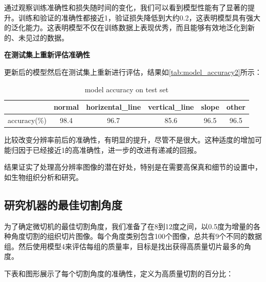 通过观察训练准确性和损失随时间的变化，我们可以看到模型性能有了显著的提升。训练和验证的准确性都接近1，验证损失降低到大约0.2，这表明模型具有强大的泛化能力。这表明模型不仅在训练数据上表现优秀，而且能够有效地泛化到新的、未见过的数据。

\textbf{在测试集上重新评估准确性}

更新后的模型然后在测试集上重新进行评估，结果如\autoref{tab:model_accuracy2}所示：

\begin{table}[H]
    \centering
    \caption{model accuracy on test set}
    \begin{tabular}{cccccc}
        \toprule
        & normal & horizental\_line & vertical\_line & slope & other \\
        \midrule
        accuracy(\%) & 98.4 & 96.7 & 85.6 & 96.5 & 96.5 \\
        \bottomrule
    \end{tabular}
    \label{tab:model_accuracy2}
    \end{table}

比较改变分辨率前后的准确性，有明显的提升，尽管不是很大。这种适度的增加可能归因于已经接近1的高准确性，进一步的改进有递减的回报。

结果证实了处理高分辨率图像的潜在好处，特别是在需要高保真和细节的设置中，如生物组织分析和研究。

\subsection{研究机器的最佳切割角度}

为了确定微切机的最佳切割角度，我们准备了在8到12度之间，以0.5度为增量的各种角度切割的组织切片图像。每个角度类别包含100个图像，总共有9个不同的数据组。然后使用模型4来评估每组的质量率，目标是找出获得高质量切片最多的角度。

下表和图形展示了每个切割角度的准确性，定义为高质量切割的百分比：

